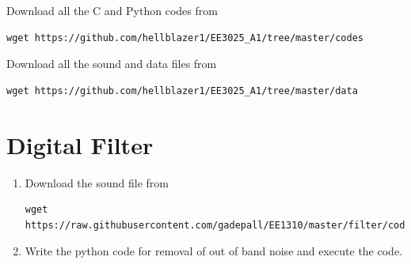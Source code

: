 \documentclass[journal,12pt,twocolumn]{IEEEtran}
\renewcommand\thesection{\arabic{section}}
\begin{document}
Download all the C and Python codes from 
\begin{lstlisting}
wget https://github.com/hellblazer1/EE3025_A1/tree/master/codes
\end{lstlisting}
Download all the sound and data files from 
\begin{lstlisting}
wget https://github.com/hellblazer1/EE3025_A1/tree/master/data
\end{lstlisting}


\section{Digital Filter}
\begin{enumerate}[label=\thesection.\arabic*,ref=\thesection.\theenumi]
\item
\label{prob:1_1}
Download the sound file from  
\begin{lstlisting}
wget https://raw.githubusercontent.com/gadepall/EE1310/master/filter/codes/Sound_Noise.wav
\end{lstlisting}
\item
\label{prob:1_2}
Write the python code for removal of out of band noise and execute the code.
\\
\solution

\end{enumerate}
\end{document}
